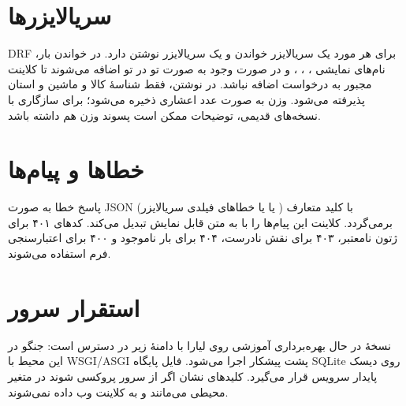 \section{سریالایزرها}

\textenglish{DRF} برای هر مورد یک سریالایزر خواندن و یک سریالایزر نوشتن دارد. در خواندن بار، نام‌های نمایشی ، ، ،  و در صورت وجود  به صورت تو در تو اضافه می‌شوند تا کلاینت مجبور به درخواست اضافه نباشد. در نوشتن، فقط شناسهٔ کالا و ماشین و استان پذیرفته می‌شود. وزن به صورت عدد اعشاری ذخیره می‌شود؛ برای سازگاری با نسخه‌های قدیمی، توضیحات ممکن است پسوند وزن هم داشته باشد.

\section{خطاها و پیام‌ها}

پاسخ خطا به صورت \textenglish{JSON} با کلید متعارف ( یا  یا خطاهای فیلدی سریالایزر) برمی‌گردد. کلاینت این پیام‌ها را با  به متن قابل نمایش تبدیل می‌کند. کدهای ۴۰۱ برای ژتون نامعتبر، ۴۰۳ برای نقش نادرست، ۴۰۴ برای بار ناموجود و ۴۰۰ برای اعتبارسنجی فرم استفاده می‌شوند.

\section{استقرار سرور}
\enlargethispage{3.6\baselineskip}

نسخهٔ در حال بهره‌برداری آموزشی روی لیارا با دامنهٔ زیر در دسترس است:
جنگو در این محیط با \textenglish{WSGI/ASGI} پشت پیشکار اجرا می‌شود. فایل پایگاه \textenglish{SQLite} روی دیسک پایدار سرویس قرار می‌گیرد. کلیدهای نشان اگر از سرور پروکسی شوند در متغیر محیطی می‌مانند و به کلاینت وب داده نمی‌شوند.
